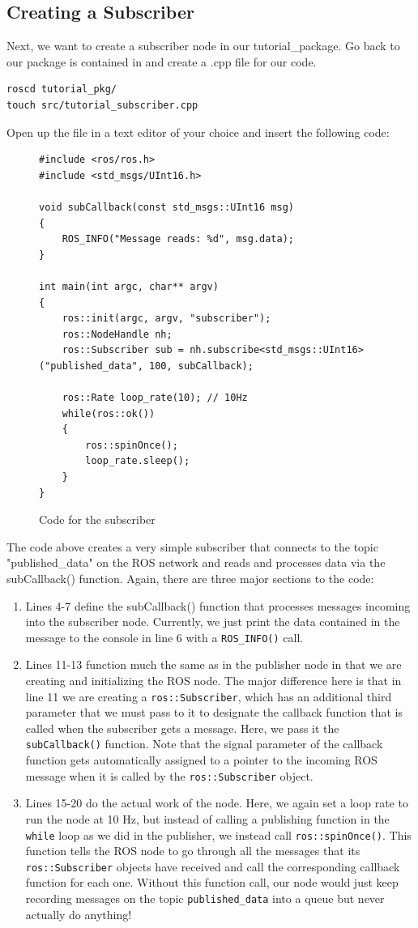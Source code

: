 \documentclass[11pt, twoside, pdftex]{article}
\begin{document}
\subsection{Creating a Subscriber}
Next, we want to create a subscriber node in our {\sf tutorial\_package}. Go back to our package is contained in and create a .cpp file for our code.
\begin{lstlisting}
roscd tutorial_pkg/
touch src/tutorial_subscriber.cpp
\end{lstlisting}
Open up the file in a text editor of your choice and insert the following code:
\begin{figure}[H]
\begin{lstlisting}
#include <ros/ros.h>
#include <std_msgs/UInt16.h>

void subCallback(const std_msgs::UInt16 msg)
{
	ROS_INFO("Message reads: %d", msg.data);
}

int main(int argc, char** argv)
{
	ros::init(argc, argv, "subscriber");
	ros::NodeHandle nh;
	ros::Subscriber sub = nh.subscribe<std_msgs::UInt16>("published_data", 100, subCallback);
	
	ros::Rate loop_rate(10); // 10Hz
	while(ros::ok())
	{
		ros::spinOnce();
		loop_rate.sleep();
	}
}
\end{lstlisting}
\caption{Code for the subscriber}
\end{figure}
The code above creates a very simple subscriber that connects to the topic "published\_data" on the ROS network and reads and processes data via the subCallback() function. Again, there are three major sections to the code:
\begin{enumerate}
	\item Lines 4-7 define the subCallback() function that processes messages incoming into the subscriber node. Currently, we just print the data contained in the message to the console in line 6 with a \lstinline|ROS_INFO()| call.
	\item Lines 11-13 function much the same as in the publisher node in that we are creating and initializing the ROS node. The major difference here is that in line 11 we are creating a \lstinline|ros::Subscriber|, which has an additional third parameter that we must pass to it to designate the callback function that is called when the subscriber gets a message. Here, we pass it the \lstinline|subCallback()| function. Note that the signal parameter of the callback function gets automatically assigned to a pointer to the incoming ROS message when it is called by the \lstinline|ros::Subscriber| object.
	\item Lines 15-20 do the actual work of the node. Here, we again set a loop rate to run the node at 10 Hz, but instead of calling a publishing function in the \lstinline|while| loop as we did in the publisher, we instead call \lstinline|ros::spinOnce()|. This function tells the ROS node to go through all the messages that its \lstinline|ros::Subscriber| objects have received and call the corresponding callback function for each one. Without this function call, our node would just keep recording messages on the topic \lstinline|published_data| into a queue but never actually do anything!
\end{enumerate}
\end{document}
